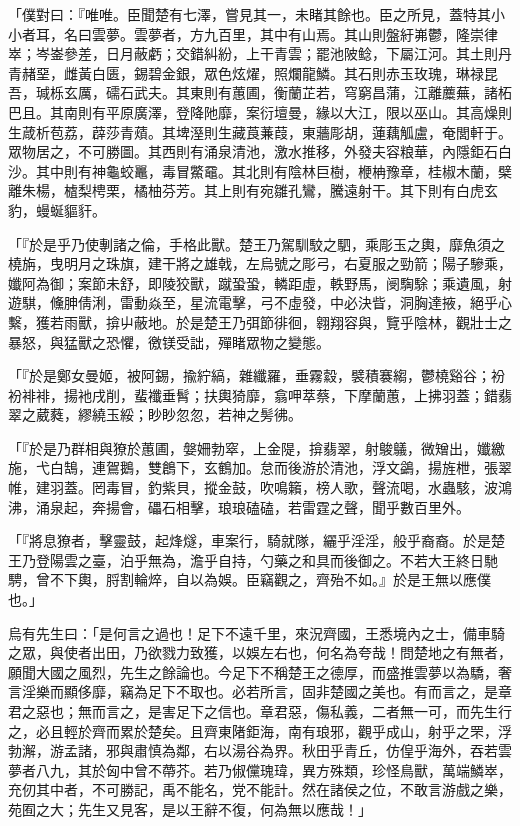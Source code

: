 \begin{pinyinscope}
「僕對曰：『唯唯。臣聞楚有七澤，嘗見其一，未睹其餘也。臣之所見，蓋特其小小者耳，名曰雲夢。雲夢者，方九百里，其中有山焉。其山則盤紆岪鬱，隆崇律崒；岑崟參差，日月蔽虧；交錯糾紛，上干青雲；罷池陂鲶，下屬江河。其土則丹青赭堊，雌黃白匮，錫碧金銀，眾色炫燿，照爛龍鱗。其石則赤玉玫瑰，琳禄昆吾，瑊栎玄厲，礝石武夫。其東則有蕙圃，衡蘭芷若，穹窮昌蒲，江離蘪蕪，諸柘巴且。其南則有平原廣澤，登降阤靡，案衍壇曼，緣以大江，限以巫山。其高燥則生葴析苞荔，薜莎青薠。其埤溼則生藏莨蒹葭，東蘠彫胡，蓮藕觚盧，奄閭軒于。眾物居之，不可勝圖。其西則有涌泉清池，激水推移，外發夫容粮華，內隱鉅石白沙。其中則有神龜蛟鼉，毒冒鱉黿。其北則有陰林巨樹，楩柟豫章，桂椒木蘭，檗離朱楊，樝梨梬栗，橘柚芬芳。其上則有宛雛孔鸞，騰遠射干。其下則有白虎玄豹，蟃蜒貙豻。

「『於是乎乃使剸諸之倫，手格此獸。楚王乃駕馴駮之駟，乘彫玉之輿，靡魚須之橈旃，曳明月之珠旗，建干將之雄戟，左烏號之彫弓，右夏服之勁箭；陽子驂乘，孅阿為御；案節未舒，即陵狡獸，蹴蛩蛩，轔距虛，軼野馬，阌騊駼；乘遺風，射遊騏，儵胂倩浰，雷動焱至，星流電擊，弓不虛發，中必決眥，洞胸達掖，絕乎心繫，獲若雨獸，揜屮蔽地。於是楚王乃弭節徘徊，翱翔容與，覽乎陰林，觀壯士之暴怒，與猛獸之恐懼，徼镁受詘，殫睹眾物之變態。

「『於是鄭女曼姬，被阿錫，揄紵縞，雜纖羅，垂霧縠，襞積褰縐，鬱橈谿谷；衯衯裶裶，揚衪戌削，蜚襳垂髾；扶輿猗靡，翕呷萃蔡，下摩蘭蕙，上拂羽蓋；錯翡翠之葳蕤，繆繞玉綏；眇眇忽忽，若神之髣彿。

「『於是乃群相與獠於蕙圃，媻姍勃窣，上金隄，揜翡翠，射鵔鸃，微矰出，孅繳施，弋白鵠，連鴐鵝，雙鶬下，玄鶴加。怠而後游於清池，浮文鷁，揚旌枻，張翠帷，建羽蓋。罔毒冒，釣紫貝，摐金鼓，吹鳴籟，榜人歌，聲流喝，水蟲駭，波鴻沸，涌泉起，奔揚會，礧石相擊，琅琅磕磕，若雷霆之聲，聞乎數百里外。

「『將息獠者，擊靈鼓，起烽燧，車案行，騎就隊，纚乎淫淫，般乎裔裔。於是楚王乃登陽雲之臺，泊乎無為，澹乎自持，勺藥之和具而後御之。不若大王終日馳騁，曾不下輿，脟割輪焠，自以為娛。臣竊觀之，齊殆不如。』於是王無以應僕也。」

烏有先生曰：「是何言之過也！足下不遠千里，來況齊國，王悉境內之士，備車騎之眾，與使者出田，乃欲戮力致獲，以娛左右也，何名為夸哉！問楚地之有無者，願聞大國之風烈，先生之餘論也。今足下不稱楚王之德厚，而盛推雲夢以為驕，奢言淫樂而顯侈靡，竊為足下不取也。必若所言，固非楚國之美也。有而言之，是章君之惡也；無而言之，是害足下之信也。章君惡，傷私義，二者無一可，而先生行之，必且輕於齊而累於楚矣。且齊東陼鉅海，南有琅邪，觀乎成山，射乎之罘，浮勃澥，游孟諸，邪與肅慎為鄰，右以湯谷為界。秋田乎青丘，仿偟乎海外，吞若雲夢者八九，其於匈中曾不蔕芥。若乃俶儻瑰瑋，異方殊類，珍怪鳥獸，萬端鱗崒，充仞其中者，不可勝記，禹不能名，党不能計。然在諸侯之位，不敢言游戲之樂，苑囿之大；先生又見客，是以王辭不復，何為無以應哉！」


\end{pinyinscope}
